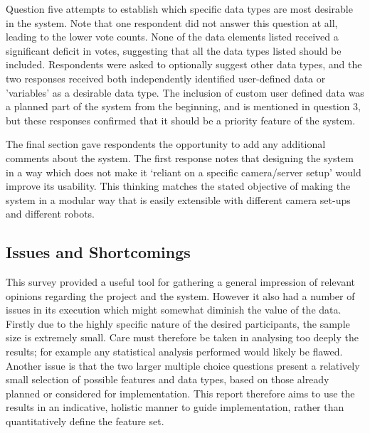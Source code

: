 Question five attempts to establish which specific data types are most desirable in the system. Note that one respondent did not answer this question at all, leading to the lower vote counts. None of the data elements listed received a significant deficit in votes, suggesting that all the data types listed should be included. Respondents were asked to optionally suggest other data types, and the two responses received both independently identified user-defined data or 'variables' as a desirable data  type. The inclusion of custom user defined data was a planned part of the system from the beginning, and is mentioned in question 3, but these responses confirmed that it should be a priority feature of the system.

The final section gave respondents the opportunity to add any additional comments about the system. The first response notes that designing the system in a way which does not make it `reliant on a specific camera/server setup' would improve its usability. This thinking matches the stated objective of making the system in a modular way that is easily extensible with different camera set-ups and different robots.


\subsection{Issues and Shortcomings}
This survey provided a useful tool for gathering a general impression of relevant opinions regarding the project and the system. However it also had a number of issues in its execution which might somewhat diminish the value of the data. Firstly due to the highly specific nature of the desired participants, the sample size is extremely small. Care must therefore be taken in analysing too deeply the results; for example any statistical analysis performed would likely be flawed. Another issue is that the two larger multiple choice questions present a relatively small selection of possible features and data types, based on those already planned or considered for implementation.  This report therefore aims to use the results in an indicative, holistic manner to guide implementation, rather than quantitatively define the feature set.


